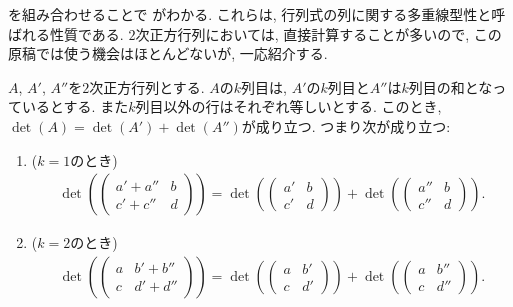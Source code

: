 を組み合わせることで
がわかる.
これらは, 行列式の列に関する多重線型性と呼ばれる性質である.
$2$次正方行列においては,
直接計算することが多いので,
この原稿では使う機会はほとんどないが,
一応紹介する.
\begin{theorem}
  \label{thm:multlin:col:add}
  $A$, $A'$, $A''$を$2$次正方行列とする.
  $A$の$k$列目は, $A'$の$k$列目と$A''$は$k$列目の和となっているとする.
  また$k$列目以外の行はそれぞれ等しいとする.
  このとき, $\det(A)=\det(A')+\det(A'')$が成り立つ.
  つまり次が成り立つ:
  \begin{enumerate}
    \item ($k=1$のとき)
      \begin{align*}
        \det(\begin{pmatrix}a'+a''&b\\c'+c''&d\end{pmatrix})=
          \det(\begin{pmatrix}a'&b\\c'&d\end{pmatrix})
            +
            \det(\begin{pmatrix}a''&b\\c''&d\end{pmatrix}).
      \end{align*}
    \item ($k=2$のとき)
      \begin{align*}
        \det(\begin{pmatrix}a&b'+b''\\c&d'+d''\end{pmatrix})=
        \det(\begin{pmatrix}a&b'\\c&d'\end{pmatrix})+
        \det(\begin{pmatrix}a&b''\\c&d''\end{pmatrix}).
      \end{align*}
  \end{enumerate}
\end{theorem}

